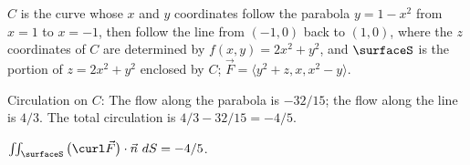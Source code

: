 {$C$ is the curve whose $x$ and $y$ coordinates follow the parabola $y=1-x^2$ from $x=1$ to $x=-1$, then follow the line from $(-1,0)$ back to $(1,0)$, where the $z$ coordinates of $C$ are determined by $f(x,y) = 2x^2+y^2$, and $\surfaceS$ is the portion of $z=2x^2+y^2$ enclosed by $C$; $\vec F = \langle y^2+z,x,x^2-y\rangle$. 

{\hfill{}\hfill}
}
{Circulation on $C$: The flow along the parabola is $-32/15$; the flow along the line is $4/3$. The total circulation is $4/3-32/15 = -4/5$.

$\iint_\surfaceS\big(\curl \vec F\big)\cdot\vec n\ dS = -4/5$.
}
